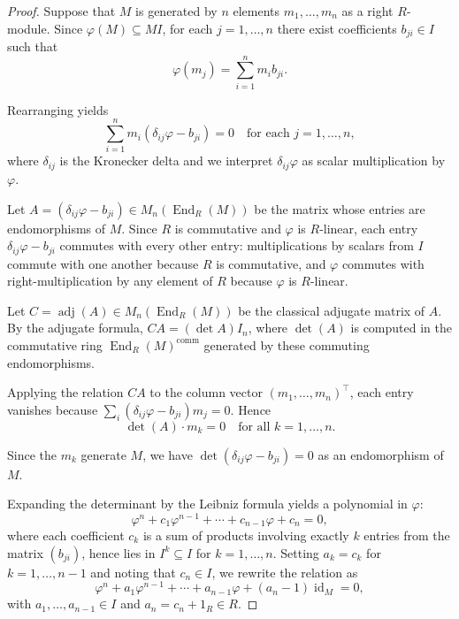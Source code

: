 \begin{proof}
	Suppose that $M$ is generated by $n$ elements $m_1, \ldots, m_n$ as a right $R$-module. Since $\varphi(M) \subseteq MI$, for each $j = 1, \ldots, n$ there exist coefficients $b_{ji} \in I$ such that
	$$\varphi(m_j) = \sum_{i=1}^n m_i b_{ji}.$$

	Rearranging yields
	$$\sum_{i=1}^n m_i (\delta_{ij}\varphi - b_{ji}) = 0 \quad \text{for each } j = 1, \ldots, n,$$
	where $\delta_{ij}$ is the Kronecker delta and we interpret $\delta_{ij}\varphi$ as scalar multiplication by $\varphi$.

	Let $A = (\delta_{ij}\varphi - b_{ji}) \in M_n(\operatorname{End}_R(M))$ be the matrix whose entries are endomorphisms of $M$. Since $R$ is commutative and $\varphi$ is $R$-linear, each entry $\delta_{ij}\varphi - b_{ji}$ commutes with every other entry: multiplications by scalars from $I$ commute with one another because $R$ is commutative, and $\varphi$ commutes with right-multiplication by any element of $R$ because $\varphi$ is $R$-linear.

	Let $C = \operatorname{adj}(A) \in M_n(\operatorname{End}_R(M))$ be the classical adjugate matrix of $A$. By the adjugate formula, $C A = (\det A) I_n$, where $\det(A)$ is computed in the commutative ring $\operatorname{End}_R(M)^{\text{comm}}$ generated by these commuting endomorphisms.

	Applying the relation $CA$ to the column vector $(m_1, \ldots, m_n)^\top$, each entry vanishes because $\sum_i (\delta_{ij}\varphi - b_{ji}) m_j = 0$. Hence
	$$\det(A) \cdot m_k = 0 \quad \text{for all } k = 1, \ldots, n.$$

	Since the $m_k$ generate $M$, we have $\det(\delta_{ij}\varphi - b_{ji}) = 0$ as an endomorphism of $M$.

	Expanding the determinant by the Leibniz formula yields a polynomial in $\varphi$:
	$$\varphi^n + c_1 \varphi^{n-1} + \cdots + c_{n-1} \varphi + c_n = 0,$$
	where each coefficient $c_k$ is a sum of products involving exactly $k$ entries from the matrix $(b_{ji})$, hence lies in $I^k \subseteq I$ for $k = 1, \ldots, n$. Setting $a_k = c_k$ for $k = 1, \ldots, n-1$ and noting that $c_n \in I$, we rewrite the relation as
	$$\varphi^n + a_1 \varphi^{n-1} + \cdots + a_{n-1} \varphi + (a_n - 1) \operatorname{id}_M = 0,$$
	with $a_1, \ldots, a_{n-1} \in I$ and $a_n = c_n + 1_R \in R$.


\end{proof}
